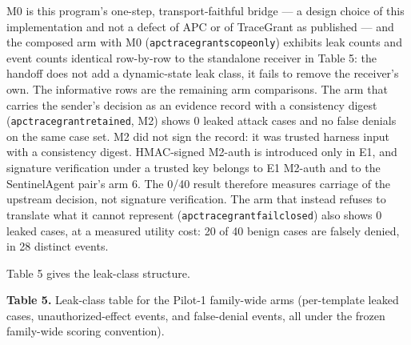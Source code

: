 \documentclass[
  10pt,
]{article}
\let\origtexttt\texttt
\renewcommand{\texttt}[1]{{\upshape\origtexttt{#1}}}
\renewcommand{\_}{\origunderscore\allowbreak}
\begin{document}
M0 is this program's one-step, transport-faithful bridge --- a design
choice of this implementation and not a defect of APC or of TraceGrant
as published --- and the composed arm with M0
(\texttt{apc\_tracegrant\_scope\_only}) exhibits leak counts and event
counts identical row-by-row to the standalone receiver in Table 5: the
handoff does not add a dynamic-state leak class, it fails to remove the
receiver's own. The informative rows are the remaining arm comparisons.
The arm that carries the sender's decision as an evidence record with a
consistency digest (\texttt{apc\_tracegrant\_retained}, M2) shows 0
leaked attack cases and no false denials on the same case set. M2 did
not sign the record: it was trusted harness input with a consistency
digest. HMAC-signed M2-auth is introduced only in E1, and signature
verification under a trusted key belongs to E1 M2-auth and to the
SentinelAgent pair's arm 6. The 0/40 result therefore measures carriage
of the upstream decision, not signature verification. The arm that
instead refuses to translate what it cannot represent
(\texttt{apc\_tracegrant\_fail\_closed}) also shows 0 leaked cases, at a
measured utility cost: 20 of 40 benign cases are falsely denied, in 28
distinct events.

Table 5 gives the leak-class structure.

\textbf{Table 5.} Leak-class table for the Pilot-1 family-wide arms
(per-template leaked cases, unauthorized-effect events, and false-denial
events, all under the frozen family-wide scoring convention).
\end{document}
